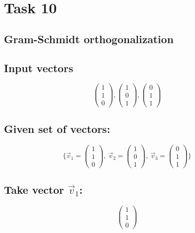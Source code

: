 \documentclass{article}
\begin{document}
\section*{Task 10}

\subsection*{Gram-Schmidt orthogonalization}
\subsection*{ \vspace{1em} Input vectors}
\[
\begin{pmatrix}1 \\ 1 \\ 0\end{pmatrix}, \begin{pmatrix}1 \\ 0 \\ 1\end{pmatrix}, \begin{pmatrix}0 \\ 1 \\ 1\end{pmatrix}
\]
\subsection*{ \vspace{1em} Given set of vectors:}
\[
\{ \vec{v}_{1} = \begin{pmatrix}1 \\ 1 \\ 0\end{pmatrix},\ \vec{v}_{2} = \begin{pmatrix}1 \\ 0 \\ 1\end{pmatrix},\ \vec{v}_{3} = \begin{pmatrix}0 \\ 1 \\ 1\end{pmatrix} \}
\]
\subsection*{ \vspace{1em} Take vector \(\vec{v}_{1}\):}
\[
\begin{pmatrix}1 \\ 1 \\ 0\end{pmatrix}
\]
\end{document}
